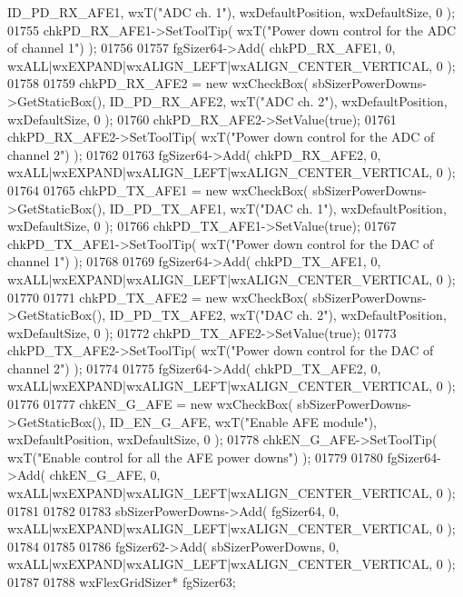 \begin{DoxyCode}
      ID_PD_RX_AFE1, wxT(\textcolor{stringliteral}{"ADC ch. 1"}), wxDefaultPosition, wxDefaultSize, 0 );
01755     chkPD_RX_AFE1->SetToolTip( wxT(\textcolor{stringliteral}{"Power down control for the ADC of  channel 1"}) );
01756     
01757     fgSizer64->Add( chkPD_RX_AFE1, 0, wxALL|wxEXPAND|wxALIGN\_LEFT|wxALIGN\_CENTER\_VERTICAL, 0 );
01758     
01759     chkPD_RX_AFE2 = \textcolor{keyword}{new} wxCheckBox( sbSizerPowerDowns->GetStaticBox(), 
      ID_PD_RX_AFE2, wxT(\textcolor{stringliteral}{"ADC ch. 2"}), wxDefaultPosition, wxDefaultSize, 0 );
01760     chkPD_RX_AFE2->SetValue(\textcolor{keyword}{true}); 
01761     chkPD_RX_AFE2->SetToolTip( wxT(\textcolor{stringliteral}{"Power down control for the ADC of channel 2"}) );
01762     
01763     fgSizer64->Add( chkPD_RX_AFE2, 0, wxALL|wxEXPAND|wxALIGN\_LEFT|wxALIGN\_CENTER\_VERTICAL, 0 );
01764     
01765     chkPD_TX_AFE1 = \textcolor{keyword}{new} wxCheckBox( sbSizerPowerDowns->GetStaticBox(), 
      ID_PD_TX_AFE1, wxT(\textcolor{stringliteral}{"DAC ch. 1"}), wxDefaultPosition, wxDefaultSize, 0 );
01766     chkPD_TX_AFE1->SetValue(\textcolor{keyword}{true}); 
01767     chkPD_TX_AFE1->SetToolTip( wxT(\textcolor{stringliteral}{"Power down control for the DAC of channel 1"}) );
01768     
01769     fgSizer64->Add( chkPD_TX_AFE1, 0, wxALL|wxEXPAND|wxALIGN\_LEFT|wxALIGN\_CENTER\_VERTICAL, 0 );
01770     
01771     chkPD_TX_AFE2 = \textcolor{keyword}{new} wxCheckBox( sbSizerPowerDowns->GetStaticBox(), 
      ID_PD_TX_AFE2, wxT(\textcolor{stringliteral}{"DAC ch. 2"}), wxDefaultPosition, wxDefaultSize, 0 );
01772     chkPD_TX_AFE2->SetValue(\textcolor{keyword}{true}); 
01773     chkPD_TX_AFE2->SetToolTip( wxT(\textcolor{stringliteral}{"Power down control for the DAC of channel 2"}) );
01774     
01775     fgSizer64->Add( chkPD_TX_AFE2, 0, wxALL|wxEXPAND|wxALIGN\_LEFT|wxALIGN\_CENTER\_VERTICAL, 0 );
01776     
01777     chkEN_G_AFE = \textcolor{keyword}{new} wxCheckBox( sbSizerPowerDowns->GetStaticBox(), ID_EN_G_AFE, wxT(\textcolor{stringliteral}{"Enable AFE module"}),
       wxDefaultPosition, wxDefaultSize, 0 );
01778     chkEN_G_AFE->SetToolTip( wxT(\textcolor{stringliteral}{"Enable control for all the AFE power downs"}) );
01779     
01780     fgSizer64->Add( chkEN_G_AFE, 0, wxALL|wxEXPAND|wxALIGN\_LEFT|wxALIGN\_CENTER\_VERTICAL, 0 );
01781     
01782     
01783     sbSizerPowerDowns->Add( fgSizer64, 0, wxALL|wxEXPAND|wxALIGN\_LEFT|wxALIGN\_CENTER\_VERTICAL, 0 );
01784     
01785     
01786     fgSizer62->Add( sbSizerPowerDowns, 0, wxALL|wxEXPAND|wxALIGN\_LEFT|wxALIGN\_CENTER\_VERTICAL, 0 );
01787     
01788     wxFlexGridSizer* fgSizer63;

\end{DoxyCode}
